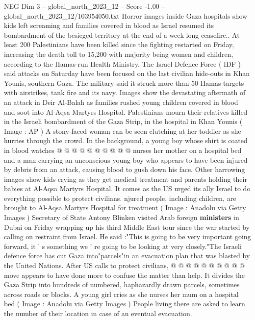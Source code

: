 \begin{textsample}{NEG Dim 3 – global\_north\_2023\_12 – Score -1.00 – global\_north\_2023\_12/103954050.txt}  \label{ex:f3_neg_233}
Horror images inside Gaza hospitals show kids left screaming and families covered in blood as Israel resumed its bombardment of the besieged territory at the end of a week-long ceasefire..
At least 200 Palestinians have been killed since the fighting restarted on Friday, increasing the death toll to 15,200 with majority being women and children, according to the Hamas-run Health Ministry.
The Israel Defence Force ( IDF ) said attacks on Saturday have been focused on the last civilian hide-outs in Khan Younis, southern Gaza.
The military said it struck more than 50 Hamas targets with airstrikes, tank fire and its navy.
Images show the devastating aftermath of an attack in Deir Al-Balah as families rushed young children covered in blood and soot into Al-Aqsa Martyrs Hospital.
Palestinians mourn their relatives killed in the Israeli bombardment of the Gaza Strip, in the hospital in Khan Younis ( Image : AP ) A stony-faced woman can be seen clutching at her toddler as she hurries through the crowd.
In the background, a young boy whose shirt is coated in blood watches @ @ @ @ @ @ @ @ @ @ nurses her mother on a hospital bed and a man carrying an unconscious young boy who appears to have been injured by debris from an attack, causing blood to gush down his face.
Other harrowing images show kids crying as they get medical treatment and parents holding their babies at Al-Aqsa Martyrs Hospital.
It comes as the US urged its ally Israel to do everything possible to protect civilians. njured people, including children, are brought to Al-Aqsa Martyrs Hospital for treatment ( Image : Anadolu via Getty Images ) Secretary of State Antony Blinken visited Arab foreign \textbf{ministers} in Dubai on Friday wrapping up his third Middle East tour since the war started by calling on restraint from Israel.
He said :"This is going to be very important going forward, it ' s something we ' re going to be looking at very closely."The Israeli defence force has cut Gaza into"parcels"in an evacuation plan that was blasted by the United Nations.
After US calls to protect civilians, @ @ @ @ @ @ @ @ @ @ move appears to have done more to confuse the matter than help.
It divides the Gaza Strip into hundreds of numbered, haphazardly drawn parcels, sometimes across roads or blocks.
A young girl cries as she nurses her mum on a hospital bed ( Image : Anadolu via Getty Images ) People living there are asked to learn the number of their location in case of an eventual evacuation.

\end{textsample}

